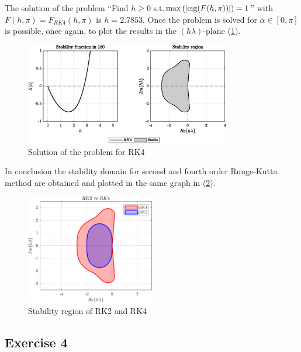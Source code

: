 \documentclass[11pt,a4paper,oneside]{article}
\begin{document}
The solution of the problem ``Find $h\ge 0$ s.t.$\max\left(|{\rm eig}(F(h,\pi))|\right) = 1$'' with $F(h,\pi) = F_{RK4}(h,\pi)$ is $h=2.7853$.
Once the problem is solved for $\alpha\in[0, \pi]$ is possible, once again, to plot the results in the $(h\lambda)$-plane (\cref{fig:ex3_stabilityRK4}).
\begin{figure}[htb]
    \centering
    \includegraphics*[width=0.8\textwidth, keepaspectratio]{ex3_rk4.eps}
    \caption[]{\label{fig:ex3_stabilityRK4} Solution of the problem for RK4}
\end{figure}

In conclusion the stability domain for second and fourth order Runge-Kutta method are obtained and plotted in the same graph in (\cref{fig:ex3_stability}).
\begin{figure}[htb]
    \centering
    \includegraphics*[width=0.5\textwidth, keepaspectratio]{ex3_stability.png}
    \caption[]{\label{fig:ex3_stability} Stability region of RK2 and RK4}
\end{figure}

\clearpage
\subsection*{Exercise 4}
\end{document}
